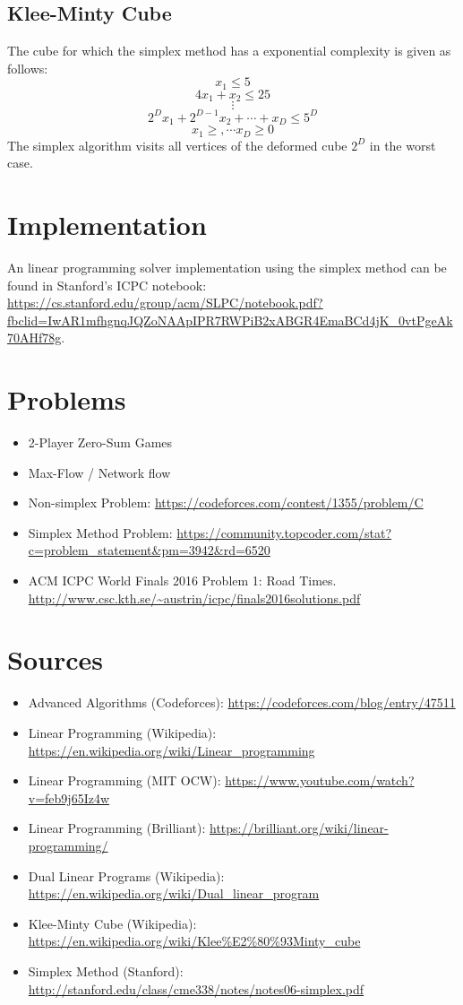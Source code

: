\documentclass{article}
\begin{document}
\subsection{Klee-Minty Cube}
The cube for which the simplex method has a exponential complexity is given as follows:
$$x_{1}\leq 5$$
$$4x_{1}+x_{2}\leq 25$$
$$\vdots$$
$$2^{D}x_{1}+2^{D-1}x_{2}+\cdots+x_{D}\leq 5^{D}$$
$$x_{1}\geq,\cdots x_{D}\geq 0$$
The simplex algorithm visits all vertices of the deformed cube $2^{D}$ in the worst case.

\section{Implementation}
An linear programming solver implementation using the simplex method can be found in Stanford's ICPC 
notebook: \url{https://cs.stanford.edu/group/acm/SLPC/notebook.pdf?fbclid=IwAR1mfhgnqJQZoNAApIPR7RWPiB2xABGR4EmaBCd4jK_0vtPgeAk70AHf78g}.

\section{Problems}
\begin{itemize}
    \item 2-Player Zero-Sum Games
    \item Max-Flow / Network flow
    \item Non-simplex Problem: \url{https://codeforces.com/contest/1355/problem/C}
    \item Simplex Method Problem: \url{https://community.topcoder.com/stat?c=problem_statement&pm=3942&rd=6520}
    \item ACM ICPC World Finals 2016 Problem 1: Road Times. \url{http://www.csc.kth.se/~austrin/icpc/finals2016solutions.pdf}
\end{itemize}

\section{Sources}
\begin{itemize}
    \item Advanced Algorithms (Codeforces): \url{https://codeforces.com/blog/entry/47511}
    \item Linear Programming (Wikipedia): \url{https://en.wikipedia.org/wiki/Linear_programming}
    \item Linear Programming (MIT OCW): \url{https://www.youtube.com/watch?v=feb9j65Iz4w}
    \item Linear Programming (Brilliant): \url{https://brilliant.org/wiki/linear-programming/}
    \item Dual Linear Programs (Wikipedia): \url{https://en.wikipedia.org/wiki/Dual_linear_program}
    \item Klee-Minty Cube (Wikipedia): \url{https://en.wikipedia.org/wiki/Klee%E2%80%93Minty_cube}
    \item Simplex Method (Stanford): \url{http://stanford.edu/class/cme338/notes/notes06-simplex.pdf}
\end{itemize}
\end{document}
